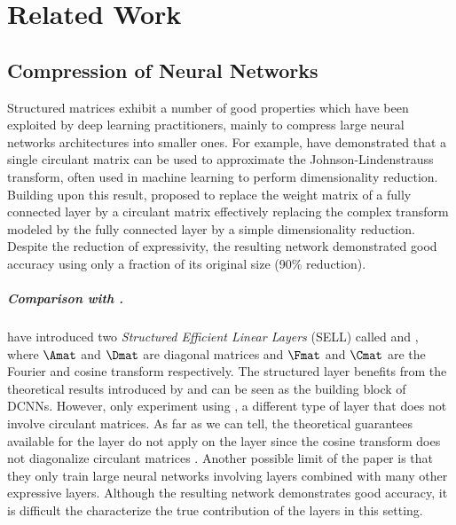 
\chapter{Related Work}
\label{chapter:related_work}
\localtableofcontents



\section{Compression of Neural Networks}
\label{section:ch3-compression_of_neural_networks}

Structured matrices exhibit a number of good properties which have been exploited by deep learning practitioners, mainly to compress large neural networks architectures into smaller ones.
For example, \citet{hinrichs2011johnson} have demonstrated that a single circulant matrix can be used to approximate the Johnson-Lindenstrauss transform, often used in machine learning to perform dimensionality reduction.
Building upon this result, \citet{cheng} proposed to replace the weight matrix of a fully connected layer by a circulant matrix effectively replacing the complex transform modeled by the fully connected layer by a simple dimensionality reduction.
Despite the reduction of expressivity, the resulting network demonstrated good accuracy using only a fraction of its original size (90\% reduction).


\paragraph{Comparison with \ACDC.}
\citet{moczulski2015acdc} have introduced two \emph{Structured Efficient Linear Layers} (SELL) called \AFDF and \ACDC, where $\Amat$ and $\Dmat$ are diagonal matrices and $\Fmat$ and $\Cmat$ are the Fourier and cosine transform respectively.
The \AFDF structured layer benefits from the theoretical results introduced by \citet{Huhtanen2015} and can be seen as the building block of DCNNs.
However, \citet{moczulski2015acdc} only experiment using \ACDC, a different type of layer that does not involve circulant matrices.
As far as we can tell, the theoretical guarantees available for the \AFDF layer do not apply on the \ACDC layer since the cosine transform does not diagonalize circulant matrices \cite{sanchez1995diagonalizing}.
Another possible limit of the \ACDC paper is that they only train large neural networks involving \ACDC layers combined with many other expressive layers.
Although the resulting network demonstrates good accuracy, it is difficult the characterize the true contribution of the \ACDC layers in this setting. 

